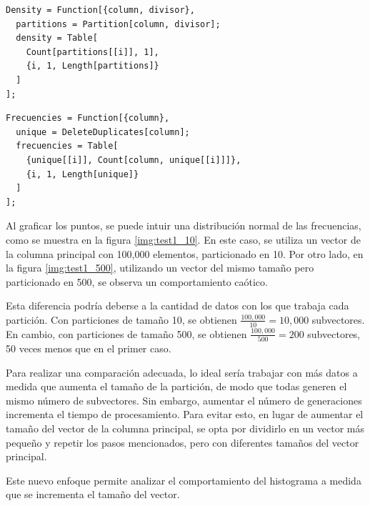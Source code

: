 \documentclass[12pt,twoside]{article}
\begin{document}
\begin{lstlisting}[style=modernMathematica, label=fun:density, caption={Partición y conteo}]
Density = Function[{column, divisor},
  partitions = Partition[column, divisor];
  density = Table[
    Count[partitions[[i]], 1], 
    {i, 1, Length[partitions]}
  ]
];
\end{lstlisting}

\begin{lstlisting}[style=modernMathematica, label=fun:frecuencies, caption={Selección de divisores}]
Frecuencies = Function[{column},
  unique = DeleteDuplicates[column];
  frecuencies = Table[
    {unique[[i]], Count[column, unique[[i]]]}, 
    {i, 1, Length[unique]}
  ]
];
\end{lstlisting}


	Al graficar los puntos, se puede intuir una distribución normal de las frecuencias, como se muestra en la figura \ref{img:test1_10}. En este caso, se utiliza un vector de la columna principal con 100,000 elementos, particionado en 10. Por otro lado, en la figura \ref{img:test1_500}, utilizando un vector del mismo tamaño pero particionado en 500, se observa un comportamiento caótico.  
	
	Esta diferencia podría deberse a la cantidad de datos con los que trabaja cada partición. Con particiones de tamaño 10, se obtienen $\frac{100,000}{10} = 10,000$ subvectores. En cambio, con particiones de tamaño 500, se obtienen $\frac{100,000}{500} = 200$ subvectores, 50 veces menos que en el primer caso.  
	
	Para realizar una comparación adecuada, lo ideal sería trabajar con más datos a medida que aumenta el tamaño de la partición, de modo que todas generen el mismo número de subvectores. Sin embargo, aumentar el número de generaciones incrementa el tiempo de procesamiento. Para evitar esto, en lugar de aumentar el tamaño del vector de la columna principal, se opta por dividirlo en un vector más pequeño y repetir los pasos mencionados, pero con diferentes tamaños del vector principal.  
	
	Este nuevo enfoque permite analizar el comportamiento del histograma a medida que se incrementa el tamaño del vector.
\end{document}
